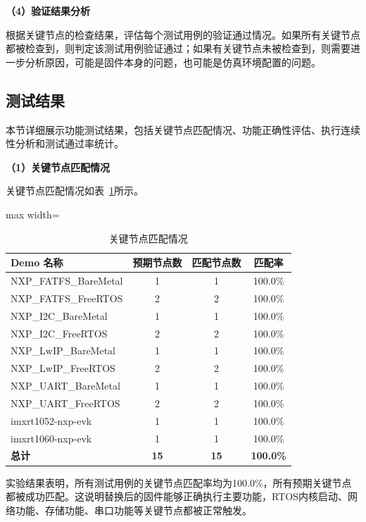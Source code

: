 \textbf{（4）验证结果分析}

根据关键节点的检查结果，评估每个测试用例的验证通过情况。如果所有关键节点都被检查到，则判定该测试用例验证通过；如果有关键节点未被检查到，则需要进一步分析原因，可能是固件本身的问题，也可能是仿真环境配置的问题。

\subsection{测试结果}

本节详细展示功能测试结果，包括关键节点匹配情况、功能正确性评估、执行连续性分析和测试通过率统计。

\textbf{（1）关键节点匹配情况}

关键节点匹配情况如表~\ref{tab:match_results}所示。

\begin{table}[htbp]
\centering
\caption{关键节点匹配情况}
\label{tab:match_results}
\begin{adjustbox}{max width=\textwidth}
\begin{tabular}{lccc}
\toprule
\textbf{Demo 名称} & \textbf{预期节点数} & \textbf{匹配节点数} & \textbf{匹配率} \\
\midrule
NXP\_FATFS\_BareMetal & 1 & 1 & 100.0\% \\
NXP\_FATFS\_FreeRTOS & 2 & 2 & 100.0\% \\
NXP\_I2C\_BareMetal & 1 & 1 & 100.0\% \\
NXP\_I2C\_FreeRTOS & 2 & 2 & 100.0\% \\
NXP\_LwIP\_BareMetal & 1 & 1 & 100.0\% \\
NXP\_LwIP\_FreeRTOS & 2 & 2 & 100.0\% \\
NXP\_UART\_BareMetal & 1 & 1 & 100.0\% \\
NXP\_UART\_FreeRTOS & 2 & 2 & 100.0\% \\
imxrt1052-nxp-evk & 1 & 1 & 100.0\% \\
imxrt1060-nxp-evk & 1 & 1 & 100.0\% \\
\midrule
\textbf{总计} & \textbf{15} & \textbf{15} & \textbf{100.0\%} \\
\bottomrule
\end{tabular}
\end{adjustbox}
\end{table}

实验结果表明，所有测试用例的关键节点匹配率均为100.0\%，所有预期关键节点都被成功匹配。这说明替换后的固件能够正确执行主要功能，RTOS内核启动、网络功能、存储功能、串口功能等关键节点都被正常触发。

